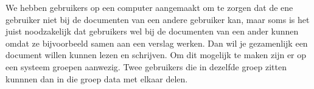 We hebben gebruikers op een computer aangemaakt om te zorgen dat de ene gebruiker niet bij de documenten van een andere gebruiker kan, maar soms is het juist noodzakelijk dat gebruikers wel bij de documenten van een ander kunnen omdat ze bijvoorbeeld samen aan een verslag werken. Dan wil je gezamenlijk een document willen kunnen lezen en schrijven. Om dit mogelijk te maken zijn er op een systeem groepen aanwezig. Twee gebruikers die in dezelfde groep zitten kunnnen dan in die groep data met elkaar delen.


